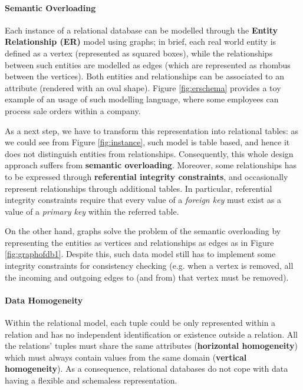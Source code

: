 \paragraph*{Semantic Overloading}\label{subsec:semanticoverloadrel}
Each instance of a relational database can be modelled through the \textbf{Entity Relationship (ER)} model  \cite{Chen1976} using graphs; in brief, each real world entity is defined as a vertex (represented as squared boxes), while the relationships between such entities are modelled as edges (which are represented as rhombus between the vertices). Both entities and relationships can be associated to an attribute (rendered with an oval shape). Figure \ref{fig:erschema} provides a toy example of an usage of such modelling language, where some employees can process sale orders within a company. 

As a next step, we have to transform this representation into relational tables: as we could see from Figure \ref{fig:instance}, such model is table based, and hence it does not distinguish  entities from relationships. Consequently, this whole design approach suffers from \textbf{semantic overloading}. Moreover, some relationships has to be expressed through \textbf{referential integrity constraints}, and occasionally represent relationships through additional tables. In particular, {referential integrity constraints} require that every value of a \textit{foreign key} must exist as a value of a \textit{primary key} within the referred table. 

On the other hand, graphs solve the problem of the semantic overloading by representing the entities as vertices and relationships as edges as in Figure \ref{fig:graphofdb1}. Despite this, such data model still has to implement some integrity constraints for consistency checking (e.g. when a vertex is removed, all the incoming and outgoing edges to (and from) that vertex must be removed).

\paragraph*{Data Homogeneity}\label{par:homog}
Within the relational model, each tuple could be only represented within a relation and has no independent identification or existence outside a relation. All the relations' tuples must share the same attributes (\textbf{horizontal homogeneity}) which must always contain values from the same domain (\textbf{vertical homogeneity}). As a consequence, relational databases do not cope  with data  having a flexible and schemaless representation. 

